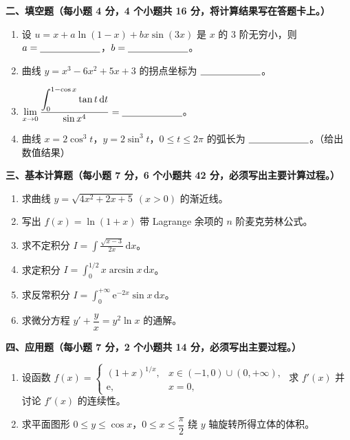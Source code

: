 \documentclass[a4paper,11pt]{ctexart}
\newcommand{\dd}{\,\mathrm{d}}
\newcommand{\e}{\mathrm{e}}
\newcommand{\blank}[1][2.2cm]{\underline{\hspace{#1}}}
\begin{document}
\vspace{0.8em}

\textbf{二、填空题（每小题 4 分，4 个小题共 16 分，将计算结果写在答题卡上。）}

\begin{enumerate}[label=\arabic*., start=7, leftmargin=2em, itemsep=0.9em, topsep=0.6em]
  \item 设 $u=x+a\ln(1-x)+bx\sin(3x)$ 是 $x$ 的 3 阶无穷小，则 $a=\blank$，$b=\blank$。

  \item 曲线 $y=x^3-6x^2+5x+3$ 的拐点坐标为 $\blank$。

  \item $\displaystyle\lim_{x\to 0}\frac{\displaystyle\int_0^{1-\cos x}\tan t\dd t}{\sin x^4}=\blank$。

  \item 曲线 $x=2\cos^3 t$，$y=2\sin^3 t$，$0\le t\le 2\pi$ 的弧长为 $\blank$。（给出数值结果）
\end{enumerate}

\newpage

\textbf{三、基本计算题（每小题 7 分，6 个小题共 42 分，必须写出主要计算过程。）}

\begin{enumerate}[label=\arabic*., start=11, leftmargin=2em, itemsep=1.0em, topsep=0.6em]
  \item 求曲线 $y=\sqrt{4x^2+2x+5}\ (x>0)$ 的渐近线。

  \item 写出 $f(x)=\ln(1+x)$ 带 Lagrange 余项的 $n$ 阶麦克劳林公式。

  \item 求不定积分 $I=\displaystyle\int\frac{\sqrt{x-3}}{2x}\dd x$。

  \item 求定积分 $I=\displaystyle\int_0^{1/2} x\arcsin x\dd x$。

  \item 求反常积分 $I=\displaystyle\int_0^{+\infty}\e^{-2x}\sin x\dd x$。

  \item 求微分方程 $y'+\dfrac{y}{x}=y^2\ln x$ 的通解。
\end{enumerate}

\vspace{1.0em}

\textbf{四、应用题（每小题 7 分，2 个小题共 14 分，必须写出主要过程。）}

\begin{enumerate}[label=\arabic*., start=17, leftmargin=2em, itemsep=1.0em, topsep=0.6em]
  \item 设函数 $f(x)=\begin{cases}(1+x)^{1/x}, & x\in(-1,0)\cup(0,+\infty),\\ \e, & x=0,\end{cases}$ 求 $f'(x)$ 并讨论 $f'(x)$ 的连续性。

  \item 求平面图形 $0\le y\le \cos x$，$0\le x\le\dfrac{\pi}{2}$ 绕 $y$ 轴旋转所得立体的体积。
\end{enumerate}
\end{document}
